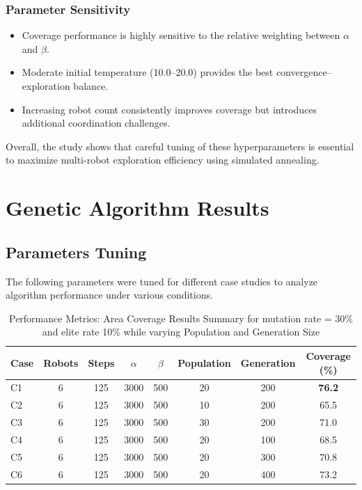 \subsubsection{Parameter Sensitivity}
\begin{itemize}
    \item Coverage performance is highly sensitive to the relative weighting between $\alpha$ and $\beta$.
    \item Moderate initial temperature (10.0–20.0) provides the best convergence–exploration balance.
    \item Increasing robot count consistently improves coverage but introduces additional coordination challenges.
\end{itemize}
Overall, the study shows that careful tuning of these hyperparameters is essential to maximize multi-robot exploration efficiency using simulated annealing.

\section{Genetic Algorithm Results}

\subsection{Parameters Tuning}

The following parameters were tuned for different case studies to analyze algorithm performance under various conditions.

\begin{table}[H]
\centering
\caption{Performance Metrics: Area Coverage Results Summary for mutation rate = 30\% and elite rate 10\% while varying Population and Generation Size}
\begin{tabular}{@{}lccccccc@{}}
\toprule
\textbf{Case} & \textbf{Robots} & \textbf{Steps} & \textbf{$\alpha$} & \textbf{$\beta$} & \textbf{Population} & \textbf{Generation} & \textbf{Coverage (\%)} \\
\midrule
C1 & 6 & 125 & 3000 & 500 & 20 & 200 & \textbf{76.2} \\
C2 & 6 & 125 & 3000 & 500 & 10 & 200 & 65.5 \\
C3 & 6 & 125 & 3000 & 500 & 30 & 200 & 71.0 \\
C4 & 6 & 125 & 3000 & 500 & 20 & 100 & 68.5 \\
C5 & 6 & 125 & 3000 & 500 & 20 & 300 & 70.8 \\
C6 & 6 & 125 & 3000 & 500 & 20 & 400 & 73.2 \\
\bottomrule
\end{tabular}
\label{tab:ga_pop_gen}
\end{table}

